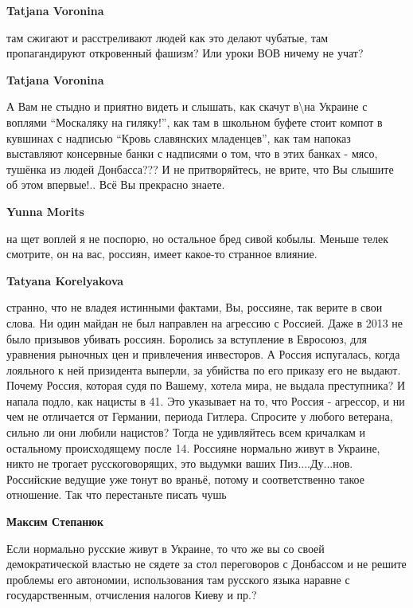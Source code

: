 \begin{itemize}
\begin{itemize}
\textbf{Tatjana Voronina} 

там сжигают и расстреливают людей как это делают чубатые, там пропагандируют
откровенный фашизм? Или уроки ВОВ ничему не учат?

\textbf{Tatjana Voronina} 

А Вам не стыдно и приятно видеть и слышать, как скачут в\textbackslash на Украине с воплями
\enquote{Москаляку на гиляку!}, как там в школьном буфете стоит компот в кувшинах с
надписью \enquote{Кровь славянских младенцев}, как там напоказ выставляют консервные
банки с надписями о том, что в этих банках - мясо, тушёнка из людей Донбасса???
И не притворяйтесь, не врите, что Вы слышите об этом впервые!.. Всё Вы
прекрасно знаете.

\textbf{Yunna Morits} 

на щет воплей я не поспорю, но остальное бред сивой кобылы. Меньше телек
смотрите, он на вас, россиян, имеет какое-то странное влияние.

\textbf{Tatyana Korelyakova} 

странно, что не владея истинными фактами, Вы, россияне, так верите в свои
слова. Ни один майдан не был направлен на агрессию с Россией. Даже в 2013 не
было призывов убивать россиян. Боролись за вступление в Евросоюз, для уравнения
рыночных цен и привлечения инвесторов. А Россия испугалась, когда лояльного к
ней призидента выперли, за убийства по его приказу его не выдают. Почему
Россия, которая судя по Вашему, хотела мира, не выдала преступника? И напала
подло, как нацисты в 41. Это указывает на то, что Россия - агрессор, и ни чем
не отличается от Германии, периода Гитлера. Спросите у любого ветерана, сильно
ли они любили нацистов? Тогда не удивляйтесь всем кричалкам и остальному
происходящему после 14. Россияне нормально живут в Украине, никто не трогает
русскоговорящих, это выдумки ваших Пиз....Ду...нов. Российские ведущие уже
тонут во враньё, потому и соответственно такое отношение. Так что перестаньте
писать чушь

\textbf{Максим Степанюк}

Если нормально русские живут в Украине, то что же вы со своей демократической
властью не сядете за стол переговоров с Донбассом и не решите проблемы его
автономии, использования там русского языка наравне с государственным,
отчисления налогов Киеву и пр.?



\end{itemize}
\end{itemize}
